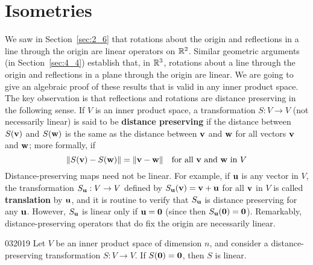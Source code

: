 \section{Isometries}
\label{sec:10_4}

We saw in Section~\ref{sec:2_6} that rotations about the origin and reflections in a line through the origin are linear operators on $\mathbb{R}^2$. Similar geometric arguments (in Section~\ref{sec:4_4}) establish that, in $\mathbb{R}^3$, rotations about a line through the origin and reflections in a plane through the origin are linear. We are going to give an algebraic proof 
of these results that is valid in any inner product space. The key observation is that reflections and rotations are distance preserving in the following sense. If $V$ is an inner product space, a transformation $S : V \to V$ (not necessarily linear) is said to be \textbf{distance preserving} if the distance between $S(\textbf{v})$ and $S(\textbf{w})$ is the same as the distance between $\textbf{v}$ and $\textbf{w}$ for all vectors $\textbf{v}$ and $\textbf{w}$; more formally, if
\begin{equation}
\label{eq:distance_preserving}
\| S(\textbf{v}) - S(\textbf{w}) \| = \| \textbf{v} - \textbf{w} \| \quad \mbox{for all } \textbf{v} \mbox{ and } \textbf{w} \mbox{ in } V
\end{equation}
Distance-preserving maps need not be linear. For example, if $\textbf{u}$ is any vector in $V$, the transformation $S_{\textbf{u}} : V \to V$ defined by $S_{\textbf{u}}(\textbf{v}) = \textbf{v} + \textbf{u}$ for all $\textbf{v}$ in $V$ is called \textbf{translation} by $\textbf{u}$, and it is routine to verify that $S_{\textbf{u}}$ is distance preserving for any $\textbf{u}$. However, $S_{\textbf{u}}$ is linear only if $\textbf{u} = \textbf{0}$ (since then $S_{\textbf{u}}(\textbf{0}) = \textbf{0}$). Remarkably, distance-preserving operators that do fix the origin are necessarily linear.

\begin{lemma}{}{032019}
Let $V$ be an inner product space of dimension $n$, and consider a distance-preserving transformation $S : V \to V$. If $S(\textbf{0}) = \textbf{0}$, then $S$ is linear.
\end{lemma}

